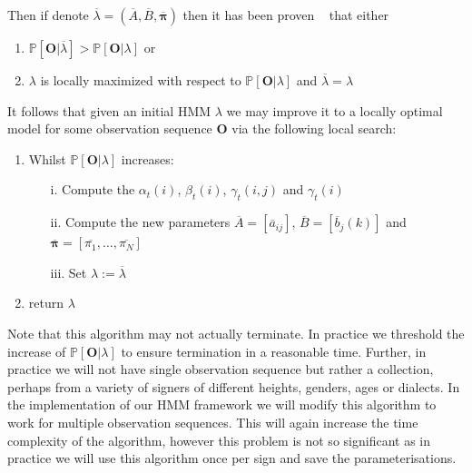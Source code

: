 Then if denote $\overline{\lambda} = (\overline{A},\overline{B},\overline{\bm{\pi}})$ then it has been proven ~\citep{levinson1983introduction, baum1968growth} that either
\begin{enumerate}
\item $\mathbb{P}[\bm{O}|\overline{\lambda}] > \mathbb{P}[\bm{O}|\lambda]$ or
\item $\lambda$ is locally maximized with respect to $\mathbb{P}[\bm{O}|\lambda]$ and $\overline{\lambda} = \lambda$
\end{enumerate}
It follows that given an initial HMM $\lambda$ we may improve it to a locally optimal model for some observation sequence $\bm{O}$ via the following local search:
\begin{enumerate}
\item Whilst $\mathbb{P}[\bm{O}|\lambda]$ increases:
	\begin{enumerate}
		\item[i.] Compute the $\alpha_t(i)$, $\beta_t(i)$, $\gamma_t(i,j)$ and $\gamma_t(i)$
		\item[ii.] Compute the new parameters $\overline{A} = [\overline{a}_{ij}]$, $\overline{B} = [\overline{b}_j(k)]$ and $\overline{\bm{\pi}} = [\overline{\pi_1}, \dots, \overline{\pi_N}]$
		\item[iii.] Set $\lambda := \overline{\lambda}$
	\end{enumerate}
\item return $\lambda$
\end{enumerate}
Note that this algorithm may not actually terminate. In practice we threshold the increase of $\mathbb{P}[\bm{O}|\lambda]$ to ensure termination in a reasonable time. Further, in practice we will not have single observation sequence but rather a collection, perhaps from a variety of signers of different heights, genders, ages or dialects. In the implementation of our HMM framework we will modify this algorithm to work for multiple observation sequences. This will again increase the time complexity of the algorithm, however this problem is not so significant as in practice we will use this algorithm once per sign and save the parameterisations.

